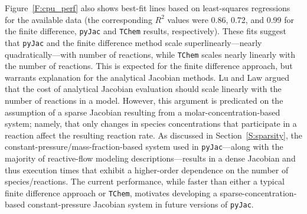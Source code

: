 \documentclass[preprint,12pt]{elsarticle}
\begin{document}
{Figure~\ref{F:cpu_perf} also shows best-fit lines based on least-squares regressions for the available data (the corresponding $R^2$ values were 0.86, 0.72, and 0.99 for the finite difference, \texttt{pyJac} and \texttt{TChem} results, respectively).
These fits suggest that \texttt{pyJac} and the finite difference method scale superlinearly---nearly quadratically---with number of reactions, while \texttt{TChem} scales nearly linearly with the number of reactions.
This is expected for the finite difference approach, but warrants explanation for the analytical Jacobian methods.
Lu and Law argued~\cite{Lu:2009gh} that the cost of analytical Jacobian evaluation should scale linearly with the number of reactions in a model.
However, this argument is predicated on the assumption of a sparse Jacobian resulting from a molar-concentration-based system; namely, that only changes in species concentrations that participate in a reaction affect the resulting reaction rate.
As discussed in Section~\ref{S:sparsity}, the constant-pressure\slash mass-fraction-based system used in \texttt{pyJac}---along with the majority of reactive-flow modeling descriptions---results in a dense Jacobian and thus execution times that exhibit a higher-order dependence on the number of species\slash reactions.
The current performance, while faster than either a typical finite difference approach or \texttt{TChem}, motivates developing a sparse-concentration-based constant-pressure Jacobian system in future versions of \texttt{pyJac}.

}
\end{document}
